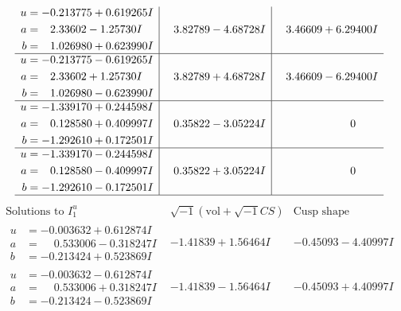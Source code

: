 \documentclass[1p]{elsarticle_modified}
\theoremstyle{definition}
\newcommand{\I}{\sqrt{-1}}
\begin{document}
$$\begin{array}{c|c|c}
\begin{aligned}
u &= -0.213775 + 0.619265 I \\
a &= \phantom{-}2.33602 - 1.25730 I \\
b &= \phantom{-}1.026980 + 0.623990 I\end{aligned}
 & \phantom{-}3.82789 - 4.68728 I & \phantom{-}3.46609 + 6.29400 I \\ \hline\begin{aligned}
u &= -0.213775 - 0.619265 I \\
a &= \phantom{-}2.33602 + 1.25730 I \\
b &= \phantom{-}1.026980 - 0.623990 I\end{aligned}
 & \phantom{-}3.82789 + 4.68728 I & \phantom{-}3.46609 - 6.29400 I \\ \hline\begin{aligned}
u &= -1.339170 + 0.244598 I \\
a &= \phantom{-}0.128580 + 0.409997 I \\
b &= -1.292610 + 0.172501 I\end{aligned}
 & \phantom{-}0.35822 - 3.05224 I & \phantom{-0.000000 } 0 \\ \hline\begin{aligned}
u &= -1.339170 - 0.244598 I \\
a &= \phantom{-}0.128580 - 0.409997 I \\
b &= -1.292610 - 0.172501 I\end{aligned}
 & \phantom{-}0.35822 + 3.05224 I & \phantom{-0.000000 } 0\\
 \hline 
 \end{array}$$\newpage$$\begin{array}{c|c|c}  
\text{Solutions to }I^u_{1}& \I (\text{vol} + \sqrt{-1}CS) & \text{Cusp shape}\\
 \hline 
\begin{aligned}
u &= -0.003632 + 0.612874 I \\
a &= \phantom{-}0.533006 - 0.318247 I \\
b &= -0.213424 + 0.523869 I\end{aligned}
 & -1.41839 + 1.56464 I & -0.45093 - 4.40997 I \\ \hline\begin{aligned}
u &= -0.003632 - 0.612874 I \\
a &= \phantom{-}0.533006 + 0.318247 I \\
b &= -0.213424 - 0.523869 I\end{aligned}
 & -1.41839 - 1.56464 I & -0.45093 + 4.40997 I \\ \hline\begin{aligned}

\end{aligned}
\end{array}$$
\end{document}
